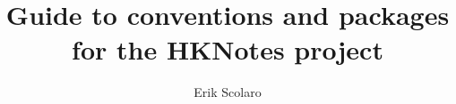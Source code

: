 \documentclass[italian,12pt,toc=sections]{HKNdocument}
\begin{document}
\title{Guide to conventions and packages for the HKNotes project}
\author{Erik Scolaro}


\docdate{\today}

\frontmatter
\maketitle
\cclicense
\tableofcontents
\clearpage

\mainmatter







\backmatter

\end{document}
